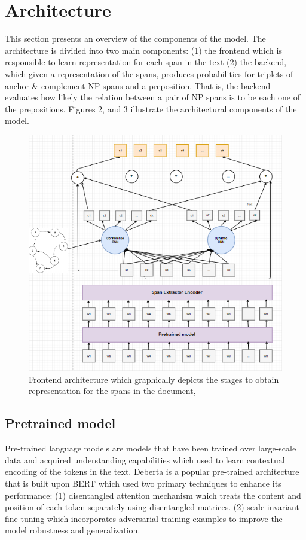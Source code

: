 \documentclass[11pt, a4paper, twocolumn]{article}
\begin{document}
\section{Architecture}
\label{architecture}

This section presents an overview of the components of the model. The architecture is divided into two main components: (1) the frontend which is responsible to learn representation for each span in the text (2) the backend, which given a representation of the spans, produces probabilities for triplets of anchor \& complement NP spans and a preposition. That is, the backend evaluates how likely the relation between a pair of NP spans is to be each one of the prepositions. Figures 2, and 3 illustrate the architectural components of the model.

\begin{figure}
    \centering
    \includegraphics[width=\linewidth]{frontend.png}
    \caption{Frontend architecture which graphically depicts the stages to obtain representation for the spans in the document,   }
    \label{fig:my_label}
\end{figure}

\subsection{Pretrained model}
\label{pretrained}

Pre-trained language models are models that have been trained over large-scale data and acquired understanding capabilities which used to learn contextual encoding of the tokens in the text.
Deberta \cite{he2021debertav3} is a popular pre-trained architecture that is built upon BERT \cite{devlin2018bert} which used two primary techniques to enhance its performance: 
(1) disentangled attention mechanism which treats the content and position of each token separately using disentangled matrices.
(2) scale-invariant fine-tuning which incorporates adversarial training examples to improve the model robustness and generalization.
\end{document}
